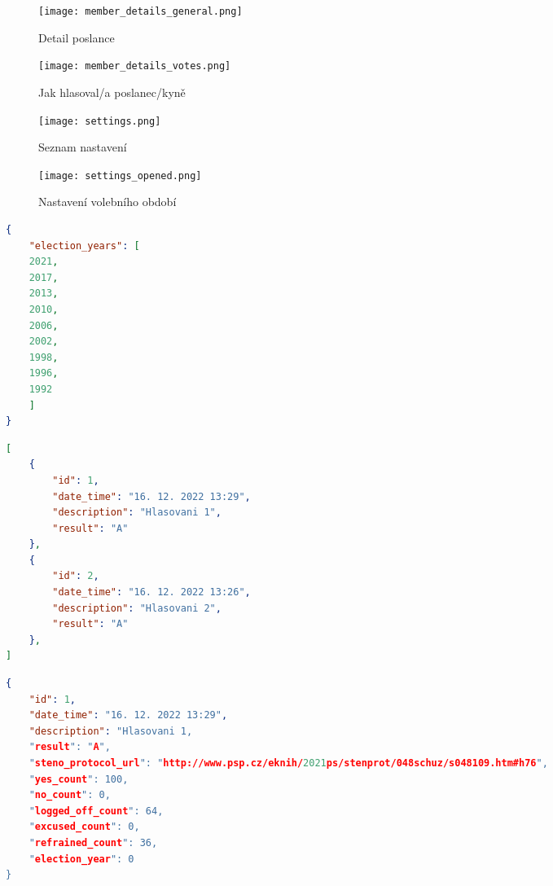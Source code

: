 \begin{figure}[H]
	\begin{minipage}{0.5\textwidth}
		\centering
		\texttt{[image: member\_details\_general.png]}
		\caption{Detail poslance}
		\label{fig:member_details_general}
	\end{minipage}%
	\begin{minipage}{0.5\textwidth}
		\centering
		\texttt{[image: member\_details\_votes.png]}
		\caption{Jak hlasoval/a poslanec/kyně}
		\label{fig:member_details_votes}
	\end{minipage}
\end{figure}

\begin{figure}[H]
	\begin{minipage}{0.5\textwidth}
		\centering
		\texttt{[image: settings.png]}
		\caption{Seznam nastavení}
		\label{fig:settings}
	\end{minipage}%
	\begin{minipage}{0.5\textwidth}
		\centering
		\texttt{[image: settings\_opened.png]}
		\caption{Nastavení volebního období}
		\label{fig:settings_opened}
	\end{minipage}
\end{figure}

\begin{lstlisting}[caption={Tělo odpovědi pro dotaz \lstinline{GET /api/app}.}, label={fig:app}, language=json,firstnumber=1,tabsize=2]
{
	"election_years": [
	2021,
	2017,
	2013,
	2010,
	2006,
	2002,
	1998,
	1996,
	1992
	]
}
\end{lstlisting}

\begin{lstlisting}[caption={Tělo odpovědi pro dotaz \lstinline{GET /api/vote}}, label={fig:vote}, language=json,firstnumber=1,tabsize=2]
[
	{
		"id": 1,
		"date_time": "16. 12. 2022 13:29",
		"description": "Hlasovani 1",
		"result": "A"
	},
	{
		"id": 2,
		"date_time": "16. 12. 2022 13:26",
		"description": "Hlasovani 2",
		"result": "A"
	},
]
\end{lstlisting}

\begin{lstlisting}[caption={Tělo odpovědi pro dotaz \lstinline{GET /api/vote{id}}}, label={fig:vote-1}, language=json,firstnumber=1,tabsize=2]
{
	"id": 1,
	"date_time": "16. 12. 2022 13:29",
	"description": "Hlasovani 1,
	"result": "A",
	"steno_protocol_url": "http://www.psp.cz/eknih/2021ps/stenprot/048schuz/s048109.htm#h76",
	"yes_count": 100,
	"no_count": 0,
	"logged_off_count": 64,
	"excused_count": 0,
	"refrained_count": 36,
	"election_year": 0
}
\end{lstlisting}

